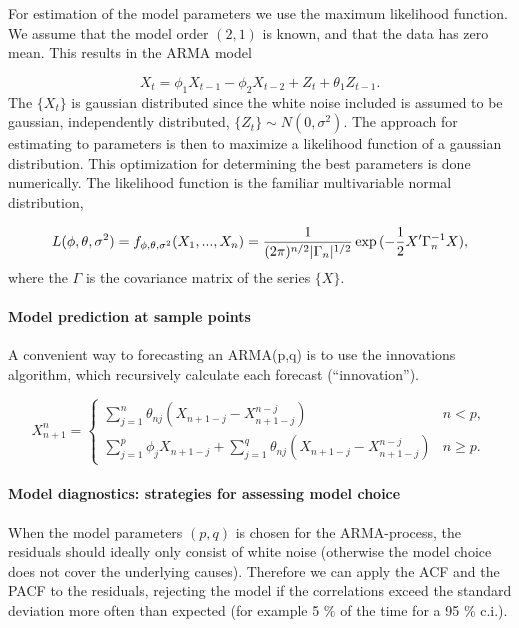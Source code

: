 \documentclass[]{article}
\let\oldparagraph\paragraph
\renewcommand{\paragraph}[1]{\oldparagraph{#1}\mbox{}}
\begin{document}
For estimation of the model parameters we use the maximum likelihood
function. We assume that the model order \((2,1)\) is known, and that
the data has zero mean. This results in the ARMA model

\[
 X_t =\phi_1X_{t-1} - \phi_2X_{t-2} + Z_t + \theta_1Z_{t-1}.
\] The \(\{X_t\}\) is gaussian distributed since the white noise
included is assumed to be gaussian, independently distributed,
\(\{Z_t\} \sim N(0,\sigma^2)\). The approach for estimating to
parameters is then to maximize a likelihood function of a gaussian
distribution. This optimization for determining the best parameters is
done numerically. The likelihood function is the familiar multivariable
normal distribution,

\[
L(\phi, \theta, \sigma^2) = f_{\phi, \theta, \sigma^2}(X_1,...,X_n) \\
= \frac{1}{(2\pi)^{n/2}|\Gamma_n|^{1/2}}\exp{(-\frac{1}{2}X'\Gamma_n^{-1}X)},
\] where the \(\Gamma\) is the covariance matrix of the series
\(\{X\}\).

\paragraph{Model prediction at sample
points}\label{model-prediction-at-sample-points}

A convenient way to forecasting an ARMA(p,q) is to use the innovations
algorithm, which recursively calculate each forecast (``innovation'').

\[
 X_{n+1}^n =
 \begin{cases}
 \sum_{j=1}^n \theta_{nj}(X_{n+1-j}-X_{n+1-j}^{n-j}) & n <p, \\
 \sum_{j=1}^p \phi_jX_{n+1-j}+\sum_{j=1}^q \theta_{nj}(X_{n+1-j}-X_{n+1-j}^{n-j}) & n\geq p.
 \end{cases}
 \]

\paragraph{Model diagnostics: strategies for assessing model
choice}\label{model-diagnostics-strategies-for-assessing-model-choice}

When the model parameters \((p,q)\) is chosen for the ARMA-process, the
residuals should ideally only consist of white noise (otherwise the
model choice does not cover the underlying causes). Therefore we can
apply the ACF and the PACF to the residuals, rejecting the model if the
correlations exceed the standard deviation more often than expected (for
example 5 \(\%\) of the time for a 95 \(\%\) c.i.).
\end{document}

